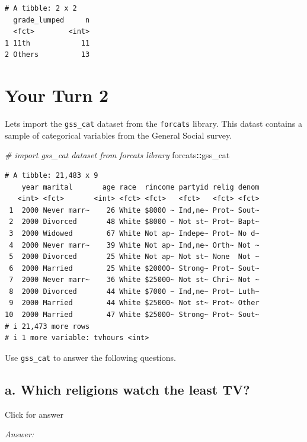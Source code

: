 \documentclass[
]{book}
\newenvironment{Shaded}{\begin{snugshade}}{\end{snugshade}}
\newcommand{\CommentTok}[1]{\textcolor[rgb]{0.56,0.35,0.01}{\textit{#1}}}
\newcommand{\NormalTok}[1]{#1}
\newcommand{\SpecialCharTok}[1]{\textcolor[rgb]{0.81,0.36,0.00}{\textbf{#1}}}
\begin{document}
\begin{verbatim}
# A tibble: 2 x 2
  grade_lumped     n
  <fct>        <int>
1 11th            11
2 Others          13
\end{verbatim}

\hypertarget{your-turn-2-2}{%
\section{Your Turn 2}\label{your-turn-2-2}}

Lets import the \texttt{gss\_cat} dataset from the \texttt{forcats} library. This datast contains a sample of categorical variables from the General Social survey.

\begin{Shaded}
\begin{Highlighting}[]
\CommentTok{\# import gss\_cat dataset from forcats library}
\NormalTok{forcats}\SpecialCharTok{::}\NormalTok{gss\_cat}
\end{Highlighting}
\end{Shaded}

\begin{verbatim}
# A tibble: 21,483 x 9
    year marital       age race  rincome partyid relig denom
   <int> <fct>       <int> <fct> <fct>   <fct>   <fct> <fct>
 1  2000 Never marr~    26 White $8000 ~ Ind,ne~ Prot~ Sout~
 2  2000 Divorced       48 White $8000 ~ Not st~ Prot~ Bapt~
 3  2000 Widowed        67 White Not ap~ Indepe~ Prot~ No d~
 4  2000 Never marr~    39 White Not ap~ Ind,ne~ Orth~ Not ~
 5  2000 Divorced       25 White Not ap~ Not st~ None  Not ~
 6  2000 Married        25 White $20000~ Strong~ Prot~ Sout~
 7  2000 Never marr~    36 White $25000~ Not st~ Chri~ Not ~
 8  2000 Divorced       44 White $7000 ~ Ind,ne~ Prot~ Luth~
 9  2000 Married        44 White $25000~ Not st~ Prot~ Other
10  2000 Married        47 White $25000~ Strong~ Prot~ Sout~
# i 21,473 more rows
# i 1 more variable: tvhours <int>
\end{verbatim}

Use \texttt{gss\_cat} to answer the following questions.

\hypertarget{a.-which-religions-watch-the-least-tv}{%
\subsection{a. Which religions watch the least TV?}\label{a.-which-religions-watch-the-least-tv}}

Click for answer

\emph{Answer:}
\end{document}
